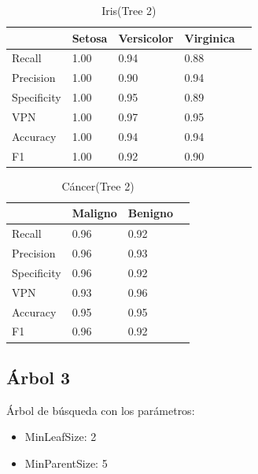 \documentclass[a4paper,openwrite,12pt]{article}
\begin{document}
\begin{table}[H]
\centering
\begin{tabular}{@{}lllll@{}}
\toprule
            & Setosa & Versicolor & Virginica &  \\ \midrule
Recall      & 1.00   & 0.94       & 0.88      &  \\
Precision   & 1.00   & 0.90       & 0.94      &  \\
Specificity & 1.00   & 0.95       & 0.89      &  \\
VPN         & 1.00   & 0.97       & 0.95      &  \\
Accuracy    & 1.00   & 0.94       & 0.94      &  \\
F1          & 1.00   & 0.92       & 0.90      &  \\ \bottomrule
\end{tabular}
\caption{Iris(Tree 2)}
\end{table}


\begin{table}[H]
\centering
\begin{tabular}{@{}llll@{}}
\toprule
            & Maligno & Benigno &  \\ \midrule
Recall      & 0.96    & 0.92    &  \\
Precision   & 0.96    & 0.93    &  \\
Specificity & 0.96    & 0.92    &  \\
VPN         & 0.93    & 0.96    &  \\
Accuracy    & 0.95    & 0.95    &  \\
F1          & 0.96    & 0.92    &  \\ \bottomrule
\end{tabular}
\caption{Cáncer(Tree 2)}
\end{table}




\subsection{Árbol 3}
Árbol de búsqueda con los parámetros:

\begin{itemize}
    \item MinLeafSize: 2
    \item MinParentSize: 5
\end{itemize}
\end{document}
